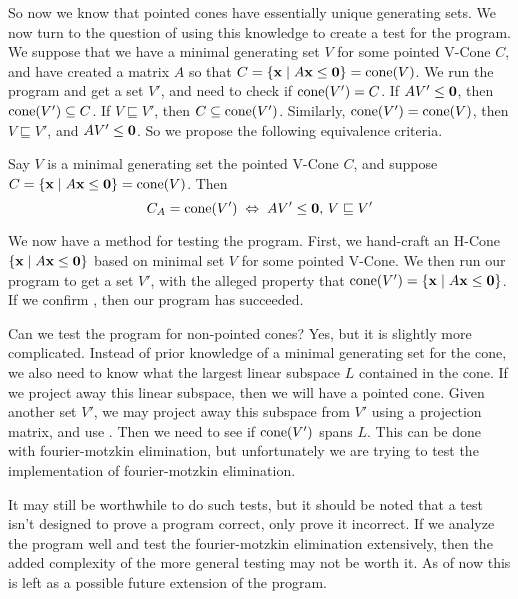 So now we know that pointed cones have essentially unique generating sets.  We now turn to the question of using this knowledge to create a test for the program.  We suppose that we have a minimal generating set $V$ for some pointed V-Cone $C$, and have created a matrix $A$ so that $C = \left\{\mathbf{x}\;|\; A\mathbf{x}\leq\mathbf{0}\right\} = \operatorname{cone}(V)$.  We run the program and get a set $V'$, and need to check if $\operatorname{cone}(V') = C$.  If $AV'\leq\mathbf{0}$, then $\operatorname{cone}(V')\subseteq C$.  If $V\sqsubseteq V'$, then $C \subseteq \operatorname{cone}(V')$.  Similarly, $\operatorname{cone}(V') = \operatorname{cone}(V)$, then $V\sqsubseteq V'$, and $AV'\leq\mathbf{0}$.  So we propose the following equivalence criteria.

\begin{EqCriteria}\label{eq_hc_vc}
	Say $V$ is a minimal generating set the pointed V-Cone $C$, and suppose $C = \left\{\mathbf{x}\;|\; A\mathbf{x}\leq\mathbf{0}\right\} = \operatorname{cone}(V)$.  Then
	\[ C_A = \operatorname{cone}(V') \;\Leftrightarrow\; AV'\leq\mathbf{0},\, V \sqsubseteq V' \]
\end{EqCriteria}

\begin{Test}\label{test_hc_to_vc}
	We now have a method for testing the program.  First, we hand-craft an H-Cone $\left\{\mathbf{x}\;|\; A\mathbf{x}\leq\mathbf{0}\right\}$ based on minimal set $V$ for some pointed V-Cone. We then run our program to get a set $V'$, with the alleged property that $\operatorname{cone}(V') = \left\{\mathbf{x}\;|\; A\mathbf{x}\leq\mathbf{0}\right\}$.  If we confirm , then our program has succeeded.
\end{Test}

\begin{Remark}
  Can we test the program for non-pointed cones?  Yes, but it is slightly more complicated.  Instead of prior knowledge of a minimal generating set for the cone, we also need to know what the largest linear subspace $L$ contained in the cone.  If we project away this linear subspace, then we will have a pointed cone.  Given another set $V'$, we may project away this subspace from $V'$ using a projection matrix, and use .  Then we need to see if $\operatorname{cone}(V')$ spans $L$.  This can be done with fourier-motzkin elimination, but unfortunately we are trying to test the implementation of fourier-motzkin elimination.

  It may still be worthwhile to do such tests, but it should be noted that a test isn't designed to prove a program correct, only prove it incorrect.  If we analyze the program well and test the fourier-motzkin elimination extensively, then the added complexity of the more general testing may not be worth it.  As of now this is left as a possible future extension of the program.
\end{Remark}

